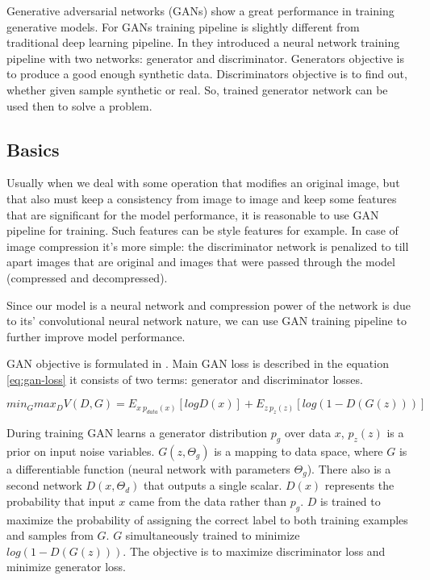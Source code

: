 Generative adversarial networks (GANs) show a great performance in training generative models. For GANs training pipeline is slightly different from traditional deep learning pipeline. In \cite{Goodfellow_Pouget-Abadie_Mirza_Xu_Warde-Farley_Ozair_Courville_Bengio_2014} they introduced a neural network training pipeline with two networks: generator and discriminator. Generators objective is to produce a good enough synthetic data. Discriminators objective is to find out, whether given sample synthetic or real. So, trained generator network can be used then to solve a problem.

\subsection{Basics}

Usually when we deal with some operation that modifies an original image, but that also must keep a consistency from image to image and keep some features that are significant for the model performance, it is reasonable to use GAN pipeline for training. Such features can be style features for example. In case of image compression it's more simple: the discriminator network is penalized to till apart images that are original and images that were passed through the model (compressed and decompressed).

Since our model is a neural network and compression power of the network is due to its' convolutional neural network nature, we can use GAN training pipeline to further improve model performance.

GAN objective is formulated in \cite{Goodfellow_Pouget-Abadie_Mirza_Xu_Warde-Farley_Ozair_Courville_Bengio_2014}. Main GAN loss is described in the equation \ref{eq:gan-loss} it consists of two terms: generator and discriminator losses.

\begin{equation}
    \label{eq:gan-loss}
    min_G max_D V(D, G) = E_{x~p_{data}(x)} [log D(x)] + E_{z~p_z(z)} [log(1 - D(G(z)))]
\end{equation}

During training GAN learns a generator distribution $p_g$ over data $x$, $p_z(z)$ is a prior on input noise variables. $G(z, \Theta_g)$ is a mapping to data space, where $G$ is a differentiable function (neural network with parameters $\Theta_g$). There also is a second network $D(x, \Theta_d)$ that outputs a single scalar. $D(x)$ represents the probability that input $x$ came from the data rather than $p_g$. $D$ is trained to maximize the probability of assigning the correct label to both training examples and samples from $G$. $G$ simultaneously trained to minimize $log(1 − D(G(z)))$. The objective is to maximize discriminator loss and minimize generator loss.

